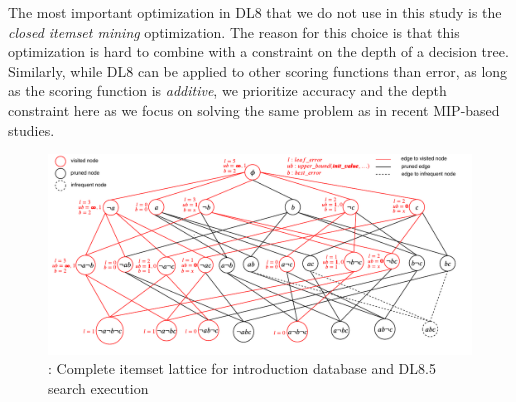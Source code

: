 The most important optimization in DL8 that we do not use in this study is the \emph{closed itemset mining} optimization. The reason for this choice is that this optimization is hard to combine with a constraint on the depth of a decision tree. Similarly, while DL8 can be applied to other scoring functions than error, as long as the scoring function is \emph{additive}, we prioritize accuracy and the depth constraint here as we focus on solving the same problem as in recent MIP-based studies.
\begin{figure}
	\includegraphics[width=\textwidth]{images/lattice_search}
	\caption{: Complete itemset lattice for introduction database and DL8.5 search execution}
	\label{fig:2}
\end{figure}

